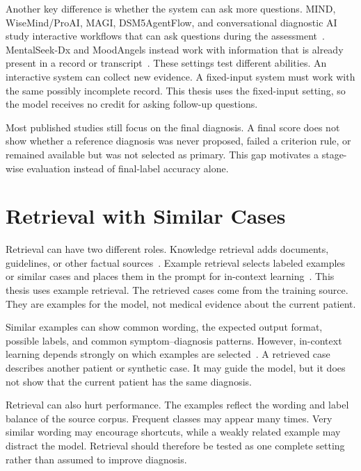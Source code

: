 \documentclass[12pt,a4paper,oneside]{report}
\begin{document}
Another key difference is whether the system can ask more questions. MIND, WiseMind/ProAI, MAGI, DSM5AgentFlow, and conversational diagnostic AI study interactive workflows that can ask questions during the assessment~\citep{li2026mind,wu2026wisemind,bi2025magi,ozgun2025dsm5agentflow,tu2025conversational}. MentalSeek-Dx and MoodAngels instead work with information that is already present in a record or transcript~\citep{sun2026mentalseek,xiao2025moodangels}. These settings test different abilities. An interactive system can collect new evidence. A fixed-input system must work with the same possibly incomplete record. This thesis uses the fixed-input setting, so the model receives no credit for asking follow-up questions.

Most published studies still focus on the final diagnosis. A final score does not show whether a reference diagnosis was never proposed, failed a criterion rule, or remained available but was not selected as primary. This gap motivates a stage-wise evaluation instead of final-label accuracy alone.

\section{Retrieval with Similar Cases}

Retrieval can have two different roles. Knowledge retrieval adds documents, guidelines, or other factual sources~\citep{lewis2020rag}. Example retrieval selects labeled examples or similar cases and places them in the prompt for in-context learning~\citep{liu2022incontext}. This thesis uses example retrieval. The retrieved cases come from the training source. They are examples for the model, not medical evidence about the current patient.

Similar examples can show common wording, the expected output format, possible labels, and common symptom--diagnosis patterns. However, in-context learning depends strongly on which examples are selected~\citep{liu2022incontext}. A retrieved case describes another patient or synthetic case. It may guide the model, but it does not show that the current patient has the same diagnosis.

Retrieval can also hurt performance. The examples reflect the wording and label balance of the source corpus. Frequent classes may appear many times. Very similar wording may encourage shortcuts, while a weakly related example may distract the model. Retrieval should therefore be tested as one complete setting rather than assumed to improve diagnosis.
\end{document}
